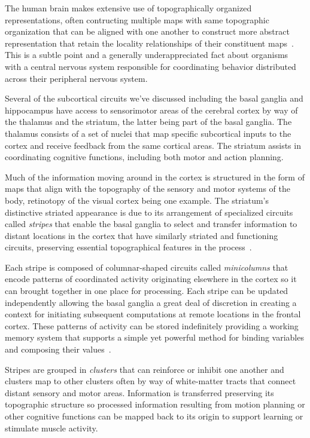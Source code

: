 The human brain makes extensive use of topographically organized representations, often contructing multiple maps with same topographic organization that can be aligned with one another to construct more abstract representation that retain the locality relationships of their constituent maps~\cite{WandelletalNEURON-07,WandelletalPTRS-B-05}. This is a subtle point and a generally underappreciated fact about organisms with a central nervous system responsible for coordinating behavior distributed across their peripheral nervous system. 

Several of the subcortical circuits we've discussed including the basal ganglia and hippocampus have access to sensorimotor areas of the cerebral cortex by way of the thalamus and the striatum, the latter being part of the basal ganglia. The thalamus consists of a set of nuclei that map specific subcortical inputs to the cortex and receive feedback from the same cortical areas. The striatum assists in coordinating cognitive functions, including both motor and action planning.

Much of the information moving around in the cortex is structured in the form of maps that align with the topography of the sensory and motor systems of the body, retinotopy of the visual cortex being one example. The striatum's distinctive striated appearance is due to its arrangement of specialized circuits called {\it{stripes}} that enable the basal ganglia to select and transfer information to distant locations in the cortex that have similarly striated and functioning circuits, preserving essential topographical features in the process~\cite{BarbasandGarcia-CabezasCOiN-16,LewisetalJNC-02}.

Each stripe is composed of columnar-shaped circuits called {\it{minicolumns}} that encode patterns of coordinated activity originating elsewhere in the cortex so it can brought together in one place for processing. Each stripe can be updated independently allowing the basal ganglia a great deal of discretion in creating a context for initiating subsequent computations at remote locations in the frontal cortex. These patterns of activity can be stored indefinitely providing a working memory system that supports a simple yet powerful method for binding variables and composing their values~\cite{OReillyetalCCN-12}.

Stripes are grouped in {\it{clusters}} that can reinforce or inhibit one another and clusters map to other clusters often by way of white-matter tracts that connect distant sensory and motor areas. Information is transferred preserving its topographic structure so processed information resulting from motion planning or other cognitive functions can be mapped back to its origin to support learning or stimulate muscle activity.

